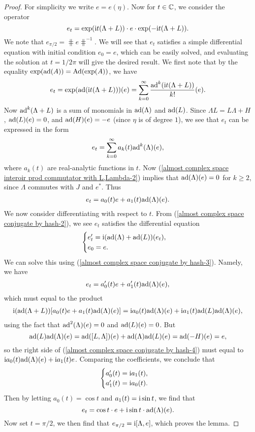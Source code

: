 \documentclass[11pt]{book}
\theoremstyle{definition}
\begin{document}
\begin{proof}
For simplicity we write $e=e(\eta)$. Now for $t\in\mathbb{C}$, we consider the operator
\[e_t=\exp(\mathrm{i} t(\Lambda+L))\cdot e\cdot \exp(-\mathrm{i} t(\Lambda+L)).\]
We note that $e_{\pi/2}=\hash e\hash^{-1}$. We will see that $e_t$ satisfies a simple differential equation with initial condition $e_0=e$, which can be easily solved, and evaluating the solution at $t=1/2\pi$ will give the desired result. We first note that by the equality $\exp(\mathrm{ad}(A))=\mathrm{Ad}(\exp(A))$, we have
\begin{align}\label{almost complex space conjugate by hash-2}
e_t=\exp(\mathrm{ad}(\mathrm{i} t(\Lambda+L)))(e)=\sum_{k=0}^{\infty}\frac{\mathrm{ad}^k(\mathrm{i} t(\Lambda+L))}{k!}(e).
\end{align}
Now $\mathrm{ad}^k(\Lambda+L)$ is a sum of monomials in $\mathrm{ad}(\Lambda)$ and $\mathrm{ad}(L)$. Since $\Lambda L=L\Lambda+H$, $\mathrm{ad}(L)(e)=0$, and $\mathrm{ad}(H)(e)=-e$ (since $\eta$ is of degree $1$), we see that $e_t$ can be expressed in the form
\[e_t=\sum_{k=0}^{\infty}a_k(t)\mathrm{ad}^k(\Lambda)(e),\]
where $a_k(t)$ are real-analytic functions in $t$. Now (\ref{almost complex space interoir prod commutator with L,Lambda-2}) implies that $\mathrm{ad}(\Lambda)(e)=0$ for $k\geq 2$, since $\Lambda$ commutes with $J$ and $e^*$. Thus
\begin{align}\label{almost complex space conjugate by hash-3}
e_t=a_0(t)e+a_1(t)\mathrm{ad}(\Lambda)(e).
\end{align}
We now consider differentiating with respect to $t$. From (\ref{almost complex space conjugate by hash-2}), we see $e_t$ satisfies the differential equation
\[\begin{cases}
e'_t=\mathrm{i}(\mathrm{ad}(\Lambda)+\mathrm{ad}(L))(e_t),\\
e_0=e.
\end{cases}\]
We can solve this using (\ref{almost complex space conjugate by hash-3}). Namely, we have
\begin{align}\label{almost complex space conjugate by hash-4}
e_t=a_0'(t)e+a_1'(t)\mathrm{ad}(\Lambda)(e),
\end{align}
which must equal to the product
\begin{align*}
\mathrm{i}(\mathrm{ad}(\Lambda+L))[a_0(t)e+a_1(t)\mathrm{ad}(\Lambda)(e)]=\mathrm{i} a_0(t)\mathrm{ad}(\Lambda)(e)+\mathrm{i} a_1(t)\mathrm{ad}(L)\mathrm{ad}(\Lambda)(e),
\end{align*}
using the fact that $\mathrm{ad}^2(\Lambda)(e)=0$ and $\mathrm{ad}(L)(e)=0$. But
\[\mathrm{ad}(L)\mathrm{ad}(\Lambda)(e)=\mathrm{ad}([L,\Lambda])(e)+\mathrm{ad}(\Lambda)\mathrm{ad}(L)(e)=\mathrm{ad}(-H)(e)=e,\]
so the right side of (\ref{almost complex space conjugate by hash-4}) must equal to $\mathrm{i} a_0(t)\mathrm{ad}(\Lambda)(e)+\mathrm{i} a_1(t)e$. Comparing the coefficients, we conclude that
\[\begin{cases}
a_0'(t)=\mathrm{i} a_1(t),\\
a_1'(t)=\mathrm{i} a_0(t).
\end{cases}\]
Then by letting $a_0(t)=\cos t$ and $a_1(t)=\mathrm{i}\sin t$, we find that
\[e_t=\cos t\cdot e+\mathrm{i}\sin t\cdot\mathrm{ad}(\Lambda)(e).\]
Now set $t=\pi/2$, we then find that $e_{\pi/2}=\mathrm{i}[\Lambda,e]$, which proves the lemma.
\end{proof}
\end{document}
